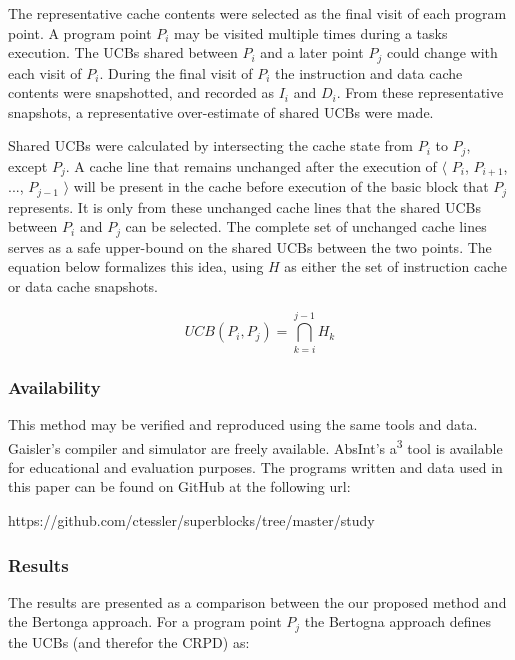 The representative cache contents were selected as the final visit of
each program point. A program point ${P_i}$ may be visited multiple
times during a tasks execution. The UCBs shared between ${P_i}$ and a
later point ${P_j}$ could change with each visit of ${P_i}$. During
the final visit of ${P_i}$ the instruction and data cache contents
were snapshotted, and recorded as ${I_i}$ and ${D_i}$. From these
representative snapshots, a representative over-estimate of shared
UCBs were made. 

Shared UCBs were calculated by intersecting the cache state from ${P_i}$
to ${P_j}$, except ${P_j}$. A cache line that remains unchanged after
the execution of ${\langle}$ ${P_i}$, ${P_{i+1}}$, ..., ${P_{j-1}}$
${\rangle}$ will be
present in the cache before execution of the basic block that ${P_j}$
represents. It is only from these unchanged cache lines that the shared UCBs
between ${P_i}$ and ${P_j}$ can be selected. The complete set of
unchanged cache lines serves as a safe upper-bound on the shared UCBs
between the two points. The equation below formalizes this idea, using
${H}$ as either the set of instruction cache or data cache snapshots.

\begin{center}
  \begin{equation*}
    UCB(P_i, P_j) = \bigcap_{k=i}^{j-1} H_k
  \end{equation*}
\end{center}

\subsubsection{Availability}

This method may be verified and reproduced using the same tools and
data. Gaisler's compiler and simulator are freely available. AbsInt's
a\textsuperscript{3} tool is available for educational and evaluation
purposes. The programs written and data used in this paper can be
found on GitHub at the following url:

\begin{center}
https://github.com/ctessler/superblocks/tree/master/study
\end{center}


\subsubsection{Results}

The results are presented as a comparison between the our proposed
method and the Bertonga approach. For a program point ${P_j}$ the 
Bertogna \cite{bertogna:11} approach defines the UCBs (and therefor the CRPD) as:

